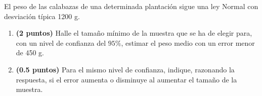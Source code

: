 
El peso de las calabazas de una determinada plantación sigue una ley Normal con desviación típica 1200 g.
\begin{enumerate}[label=\alph*)]
\item \textbf{(2 puntos)} Halle el tamaño mínimo de la muestra que se ha de elegir para, con un nivel de confianza del $95\%$, estimar el peso medio con un error menor de 450 g.
\item \textbf{(0.5 puntos)} Para el mismo nivel de confianza, indique, razonando la respuesta, si el error aumenta o disminuye al aumentar el tamaño de la muestra.
\end{enumerate}
